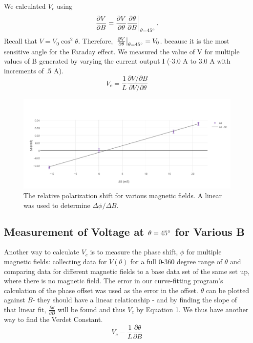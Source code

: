 \documentclass[prb,preprint]{revtex4-1}
\begin{document}
{{We calculated $V_{c}$ using 
\begin{equation}
\left. \frac{\partial V}{\partial B}=\frac{\partial V}{\partial \theta} \frac{\partial \theta}{\partial B}\right|_{\theta=45\degree}.
\end{equation}
Recall that
$V=V_{0}\cos^2{\theta}$. Therefore,  $\left.\frac{\partial V}{\partial \theta}\right|_{\theta=45\degree} =V_0$.  because it is the most sensitive angle for the Faraday effect. We measured the value of V for multiple values of B generated by varying the current output I (-3.0 A to 3.0 A with increments of .5 A).
\begin{equation}
V_{c} =\frac{1}{L}  \frac{\partial V/\partial B}{\partial V/\partial \theta} 
\end{equation}

\begin{figure}
\includegraphics[width =6.3in]{verdet1.pdf}
\caption{\label{method2pic} The relative polarization shift for various magnetic fields. A linear was used to determine $\Delta \phi/\Delta B$.}
\end{figure}
\subsection{Measurement of Voltage at $\theta = 45\degree$ for Various B}

Another way to calculate $V_{c}$ is to measure the phase shift, $\phi$ for multiple magnetic fields:  collecting data for $V(\theta)$ for a full 0-360 degree range of $\theta$ and comparing data for different magnetic fields to a base data set of the same set up, where there is no magnetic field.  The error in our curve-fitting program's calculation of the phase offset was used as the error in the offset.  $\theta$ can be plotted against $B$- they should have a linear relationship \cite{expphysics}- and by finding the slope of that linear fit, $\frac{\partial \theta}{\partial B}$ will be found and thus $V_{c}$ by Equation 1. We thus have another way to find the Verdet Constant.
\begin{equation}
V_{c} =\frac{1}{L} \frac{\partial \theta}{\partial B} 
\end{equation}

}}
\end{document}
